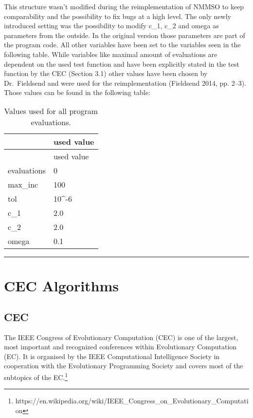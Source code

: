\documentclass[12pt,a4paper]{article}
\begin{document}
This structure wasn't modified during the reimplementation of NMMSO to
keep comparability and the possibility to fix bugs at a high level. The
only newly introduced setting was the possibility to modify c\_1, c\_2
and omega as parameters from the outside. In the original version those
parameters are part of the program code. All other variables have been
set to the variables seen in the following table. While variables like
maximal amount of evaluations are dependent on the used test function
and have been explicitly stated in the test function by the CEC (Section
3.1) other values have been chosen by Dr.~Fieldsend and were used for
the reimplementation (Fieldsend 2014, pp. 2--3). Those values can be
found in the following table:

\begin{longtable}[c]{@{}ll@{}}
\caption{Values used for all program evaluations.}\tabularnewline
\toprule
& used value\tabularnewline
\midrule
\endfirsthead
\toprule
& used value\tabularnewline
\midrule
\endhead
evaluations & 0\tabularnewline
max\_inc & 100\tabularnewline
tol & 10\^{}-6\tabularnewline
c\_1 & 2.0\tabularnewline
c\_2 & 2.0\tabularnewline
omega & 0.1\tabularnewline
\bottomrule
\end{longtable}

\begin{center}\rule{0.5\linewidth}{\linethickness}\end{center}

\section{CEC Algorithms}\label{cec-algorithms}

\subsection{CEC}\label{cec}

The IEEE Congress of Evolutionary Computation (CEC) is one of the
largest, most important and recognized conferences within Evolutionary
Computation (EC). It is organised by the IEEE Computational Intelligence
Society in cooperation with the Evolutionary Programming Society and
covers most of the subtopics of the EC.\footnote{https://en.wikipedia.org/wiki/IEEE\_Congress\_on\_Evolutionary\_Computation}
\end{document}
